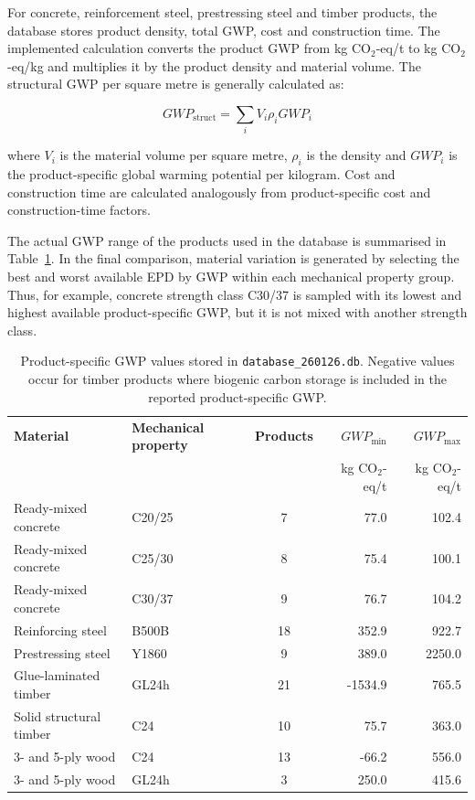\noindent For concrete, reinforcement steel, prestressing steel and timber products, the database stores product density, total GWP, cost and construction time. The implemented calculation converts the product GWP from kg CO$_2$-eq/t to kg CO$_2$-eq/kg and multiplies it by the product density and material volume. The structural GWP per square metre is generally calculated as:

\[
    GWP_{\mathrm{struct}}
    =
    \sum_i
    V_i \rho_i GWP_i
\]

\noindent where $V_i$ is the material volume per square metre, $\rho_i$ is the density and $GWP_i$ is the product-specific global warming potential per kilogram. Cost and construction time are calculated analogously from product-specific cost and construction-time factors.

\noindent The actual GWP range of the products used in the database is summarised in Table~\ref{tab:product_specific_gwp_values}. In the final comparison, material variation is generated by selecting the best and worst available EPD by GWP within each mechanical property group. Thus, for example, concrete strength class C30/37 is sampled with its lowest and highest available product-specific GWP, but it is not mixed with another strength class.

\begin{table}[htbp]
    \centering
    \begingroup
    \scriptsize
    \setlength{\tabcolsep}{3pt}
    \renewcommand{\arraystretch}{1.12}
    \begin{tabularx}{\textwidth}{@{}l|l|c|r|r@{}}
    \hline
    \textbf{Material} & \textbf{Mechanical property} & \textbf{Products} & \textbf{$GWP_{\min}$} & \textbf{$GWP_{\max}$} \\
    & & & kg CO$_2$-eq/t & kg CO$_2$-eq/t \\ \hline
    Ready-mixed concrete & C20/25 & 7 & 77.0 & 102.4 \\
    Ready-mixed concrete & C25/30 & 8 & 75.4 & 100.1 \\
    Ready-mixed concrete & C30/37 & 9 & 76.7 & 104.2 \\
    Reinforcing steel & B500B & 18 & 352.9 & 922.7 \\
    Prestressing steel & Y1860 & 9 & 389.0 & 2250.0 \\
    Glue-laminated timber & GL24h & 21 & -1534.9 & 765.5 \\
    Solid structural timber & C24 & 10 & 75.7 & 363.0 \\
    3- and 5-ply wood & C24 & 13 & -66.2 & 556.0 \\
    3- and 5-ply wood & GL24h & 3 & 250.0 & 415.6 \\ \hline
    \end{tabularx}
    \endgroup
    \caption{Product-specific GWP values stored in \texttt{database\_260126.db}. Negative values occur for timber products where biogenic carbon storage is included in the reported product-specific GWP.}
    \label{tab:product_specific_gwp_values}
\end{table}

